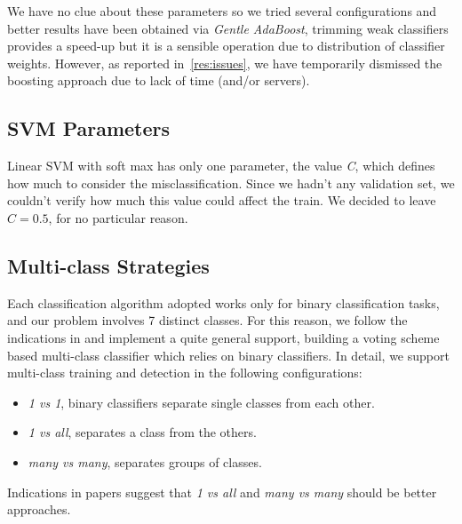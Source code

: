 We have no clue about these parameters so we tried several configurations and better results have been obtained via \emph{Gentle AdaBoost}, trimming weak classifiers provides a speed-up but it is a sensible operation due to distribution of classifier weights. However, as reported in~\ref{res:issues}, we have temporarily dismissed the boosting approach due to lack of time (and/or servers).

\subsection{SVM Parameters}

Linear SVM with soft max has only one parameter, the value \emph{C}, which
defines how much to consider the misclassification. Since we hadn't any
validation set, we couldn't verify how much this value could affect the train.
We decided to leave $C=0.5$, for no particular reason.

\subsection{Multi-class Strategies}

Each classification algorithm adopted works only for binary classification tasks, and our problem involves 7 distinct classes. For this reason, we follow the indications in \cite{Littlewort04dynamicsof, Bartlett06fullyautomatic} and implement a quite general support, building a voting scheme based multi-class classifier which relies on binary classifiers.
In detail, we support multi-class training and detection in the following configurations:

\begin{itemize}
\item \emph{1 vs 1}, binary classifiers separate single classes from each other.
\item \emph{1 vs all}, separates a class from the others.
\item \emph{many vs many}, separates groups of classes.
\end{itemize}

Indications in papers suggest that \emph{1 vs all} and \emph{many vs many} should be better approaches.